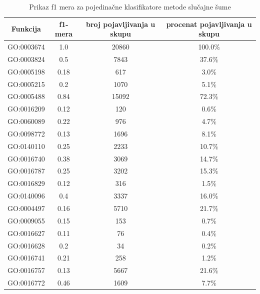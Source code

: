 \begin{table}[H]
	\centering
	\begin{tabular}{|c|c|c|c|}
		\hline
		Funkcija & f1-mera & broj pojavljivanja u skupu & procenat pojavljivanja u skupu \\
		\hline
		GO:0003674 & 1.0 & 20860 & 100.0\% \\
		\hline
		GO:0003824 & 0.5 & 7843 & 37.6\% \\
		\hline
		GO:0005198 & 0.18 & 617 & 3.0\% \\
		\hline
		GO:0005215 & 0.2 & 1070 & 5.1\% \\
		\hline
		GO:0005488 & 0.84 & 15092 & 72.3\% \\
		\hline
		GO:0016209 & 0.12 & 120 & 0.6\% \\
		\hline
		GO:0060089 & 0.22 & 976 & 4.7\% \\
		\hline
		GO:0098772 & 0.13 & 1696 & 8.1\% \\
		\hline
		GO:0140110 & 0.25 & 2233 & 10.7\% \\
		\hline
		GO:0016740 & 0.38 & 3069 & 14.7\% \\
		\hline
		GO:0016787 & 0.25 & 3202 & 15.3\% \\
		\hline
		GO:0016829 & 0.12 & 316 & 1.5\% \\
		\hline
		GO:0140096 & 0.4 & 3337 & 16.0\% \\
		\hline
		GO:0004497 & 0.16 & 5710 & 21.7\% \\
		\hline
		GO:0009055 & 0.15 & 153 & 0.7\% \\
		\hline
		GO:0016627 & 0.11 & 76 & 0.4\% \\
		\hline
		GO:0016628 & 0.2 & 34 & 0.2\% \\
		\hline
		GO:0016741 & 0.21 & 258 & 1.2\% \\
		\hline
		GO:0016757 & 0.13 & 5667 & 21.6\% \\
		\hline
		GO:0016772 & 0.46 & 1609 & 7.7\% \\
		\hline
	\end{tabular}
	\caption{Prikaz f1 mera za pojedina\v cne klasifikatore metode slučajne šume}
	\label{tab: rfF1}
\end{table}

